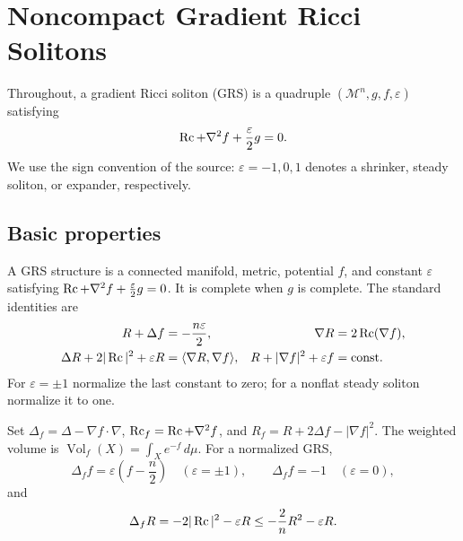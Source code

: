 \chapter{Noncompact Gradient Ricci Solitons}
\label{ch:chow-iv-noncompact-gradient-ricci-solitons}

Throughout, a gradient Ricci soliton (GRS) is a quadruple
$(\mathcal M^n,g,f,\varepsilon)$ satisfying
\[
\operatorname{Rc}+\nabla^2f+\frac{\varepsilon}{2}g=0.
\]
We use the sign convention of the source: $\varepsilon=-1,0,1$ denotes a
shrinker, steady soliton, or expander, respectively.

\section{Basic properties}

\begin{definition}
\label{def:chow-iv-grs-structure}
A GRS structure is a connected manifold, metric, potential $f$, and constant
$\varepsilon$ satisfying $\operatorname{Rc}+\nabla^2f+\frac{\varepsilon}{2}g=0$.  It is complete
when $g$ is complete.  The standard identities are
\begin{align*}
R+\Delta f&=-\frac{n\varepsilon}{2},&
\nabla R&=2\operatorname{Rc}(\nabla f),\\
\Delta R+2|\operatorname{Rc}|^2+\varepsilon R&=\langle\nabla R,\nabla f\rangle,&
R+|\nabla f|^2+\varepsilon f&=\mathrm{const}.
\end{align*}
For $\varepsilon=\pm1$ normalize the last constant to zero; for a nonflat
steady soliton normalize it to one.
\end{definition}

\begin{definition}
\label{def:chow-iv-weighted-operators}
Set $\Delta_f=\Delta-\nabla f\cdot\nabla$, $\operatorname{Rc}_f=\operatorname{Rc}+\nabla^2f$, and
$R_f=R+2\Delta f-|\nabla f|^2$.  The weighted volume is
$\operatorname{Vol}_f(X)=\int_Xe^{-f}\,d\mu$.  For a normalized GRS,
\[
\Delta_f f=\varepsilon\left(f-\frac n2\right)\quad(\varepsilon=\pm1),
\qquad \Delta_f f=-1\quad(\varepsilon=0),
\]
and
\[
\Delta_fR=-2|\operatorname{Rc}|^2-\varepsilon R\le -\frac2nR^2-\varepsilon R.
\]
\end{definition}

